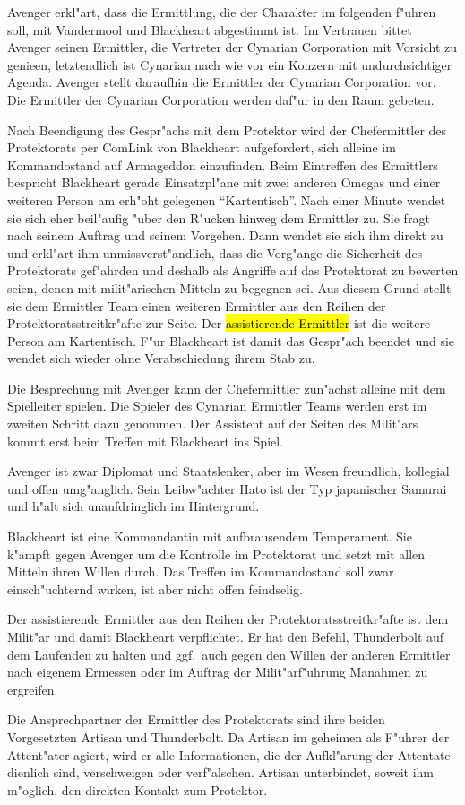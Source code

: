Avenger erkl"art, dass die Ermittlung, die der Charakter im folgenden f"uhren soll, mit Vandermool und Blackheart abgestimmt ist. Im Vertrauen bittet Avenger seinen Ermittler, die Vertreter der Cynarian Corporation mit Vorsicht zu genie\3en, letztendlich ist Cynarian nach wie vor ein Konzern mit undurchsichtiger Agenda. Avenger stellt daraufhin die Ermittler der Cynarian Corporation vor. Die Ermittler der Cynarian Corporation werden daf"ur in den Raum gebeten.

Nach Beendigung des Gespr"achs mit dem Protektor wird der Chefermittler des Protektorats per ComLink von Blackheart aufgefordert, sich alleine im Kommandostand auf Armageddon einzufinden. Beim Eintreffen des Ermittlers bespricht Blackheart gerade Einsatzpl"ane mit zwei anderen Omegas und einer weiteren Person am erh"oht gelegenen ``Kartentisch''. Nach einer Minute wendet sie sich eher beil"aufig "uber den R"ucken hinweg dem Ermittler zu. Sie fragt nach seinem Auftrag und seinem Vorgehen. Dann wendet sie sich ihm direkt zu und erkl"art ihm unmissverst"andlich, dass die Vorg"ange die Sicherheit des Protektorats gef"ahrden und deshalb als Angriffe auf das Protektorat zu bewerten seien, denen mit milit"arischen Mitteln zu begegnen sei. Aus diesem Grund stellt sie dem Ermittler Team einen weiteren Ermittler aus den Reihen der Protektoratsstreitkr"afte zur Seite. Der \hl{assistierende Ermittler} ist die weitere Person am Kartentisch. F"ur Blackheart ist damit das Gespr"ach beendet und sie wendet sich wieder ohne Verabschiedung ihrem Stab zu.
\vfill


\begin{remarks}
	Die Besprechung mit Avenger kann der Chefermittler zun"achst alleine mit dem Spielleiter spielen. Die Spieler des Cynarian Ermittler Teams werden erst im zweiten Schritt dazu genommen. Der Assistent auf der Seiten des Milit"ars kommt erst beim Treffen mit Blackheart ins Spiel.
	
	Avenger ist zwar Diplomat und Staatslenker, aber im Wesen freundlich, kollegial und offen umg"anglich. Sein Leibw"achter Hato ist der Typ japanischer Samurai und h"alt sich unaufdringlich im Hintergrund.
	
	Blackheart ist eine Kommandantin mit aufbrausendem Temperament. Sie k"ampft gegen Avenger um die Kontrolle im Protektorat und setzt mit allen Mitteln ihren Willen durch. Das Treffen im Kommandostand soll zwar einsch"uchternd wirken, ist aber nicht offen feindselig.
	
	Der assistierende Ermittler aus den Reihen der Protektoratsstreitkr"afte ist dem Milit"ar und damit Blackheart verpflichtet. Er hat den Befehl, Thunderbolt auf dem Laufenden zu halten und ggf.~auch gegen den Willen der anderen Ermittler nach eigenem Ermessen oder im Auftrag der Milit"arf"uhrung Ma\3nahmen zu ergreifen.

	Die Ansprechpartner der Ermittler des Protektorats sind ihre beiden Vorgesetzten Artisan und Thunderbolt. Da Artisan im geheimen als F"uhrer der Attent"ater agiert, wird er alle Informationen, die der Aufkl"arung der Attentate dienlich sind, verschweigen oder verf"alschen. Artisan unterbindet, soweit ihm m"oglich, den direkten Kontakt zum Protektor.
\end{remarks}